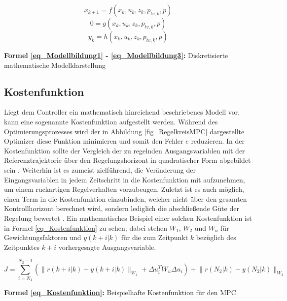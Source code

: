 \begin{equation} \label{eq_Modellbildung1}
    x_{k+1} = f(x_k, u_k, z_k, p_{tv,k}, p)
\end{equation}
\vspace*{-2.5\baselineskip}
\begin{equation} \label{eq_Modellbildung2}
    0 = g(x_k, u_k, z_k, p_{tv,k}, p)
\end{equation}
\vspace*{-2.5\baselineskip}
\begin{equation} \label{eq_Modellbildung3}
    y_k = h(x_k, u_k, z_k, p_{tv,k}, p)
\end{equation}
\centerline{\small{\textsf{\textbf{Formel \ref{eq_Modellbildung1} - \ref{eq_Modellbildung3}:}} Diskretisierte mathematische Modelldarstellung}}


\subsection{Kostenfunktion} \label{subsec_Kostenfunktion}
Liegt dem Controller ein mathematisch hinreichend beschriebenes Modell vor, kann eine sogenannte Kostenfunktion aufgestellt werden.
Während des Optimierungsprozesses wird der in Abbildung \ref{fig_RegelkreisMPC} dargestellte Optimizer diese Funktion minimieren und somit den Fehler $e$ reduzieren.
In der Kostenfunktion sollte der Vergleich der zu regelnden Ausgangsvariablen mit der Referenztrajektorie über den Regelungshorizont in quadratischer Form abgebildet sein \cite[S.24]{Diehl}\cite[S.3]{Schwenzer}.
Weiterhin ist es zumeist zielführend, die Veränderung der Eingangsvariablen in jedem Zeitschritt in die Kostenfunktion mit aufzunehmen, um einem ruckartigen Regelverhalten vorzubeugen.
Zuletzt ist es auch möglich, einen Term in die Kostenfunktion einzubinden, welcher nicht über den gesamten Kontrollhorizont berechnet wird, sondern lediglich die abschließende Güte der Regelung bewertet \cite[S.24]{Diehl}.
Ein mathematisches Beispiel einer solchen Kostenfunktion ist in Formel \ref{eq_Kostenfunktion} zu sehen; dabei stehen $W_1$, $W_2$ und $W_u$ für Gewichtungsfaktoren und $y(k+i\rvert k)$ für die zum Zeitpunkt $k$ bezüglich des Zeitpunktes $k+i$ vorhergesagte Ausgangsvariable. \cite[S.3]{Schwenzer}

\begin{equation} \label{eq_Kostenfunktion}
    J = \sum_{i=N_1}^{N_2-1}\left(\lVert r(k+i\rvert k)-y(k+i\rvert k)\rVert_{W_1} + \Delta u_i^T W_u \Delta u_i\right) + \lVert r(N_2\rvert k)-y(N_2\rvert k)\rVert_{W_2}
\end{equation}
\centerline{\small{\textsf{\textbf{Formel \ref{eq_Kostenfunktion}:}} Beispielhafte Kostenfunktion für den MPC}}


